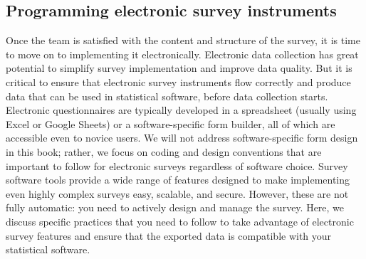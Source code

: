 \subsection{Programming electronic survey instruments}
Once the team is satisfied with the content and structure of the survey,
it is time to move on to implementing it electronically.
Electronic data collection has great potential
to simplify survey implementation and improve data quality.
But it is critical to ensure that electronic survey instruments
flow correctly and produce data that can be used in statistical software,
before data collection starts.
Electronic questionnaires are typically developed
in a spreadsheet (usually using Excel or Google Sheets)
or a software-specific form builder,
all of which are accessible even to novice users.
We will not address software-specific form design in this book;
rather, we focus on coding and design conventions that are important to follow
for electronic surveys regardless of software choice.
Survey software tools provide a wide range of features
designed to make implementing even highly complex surveys
easy, scalable, and secure.
However, these are not fully automatic:
you need to actively design and manage the survey.
Here, we discuss specific practices that you need to follow
to take advantage of electronic survey features
and ensure that the exported data
is compatible with your statistical software.

